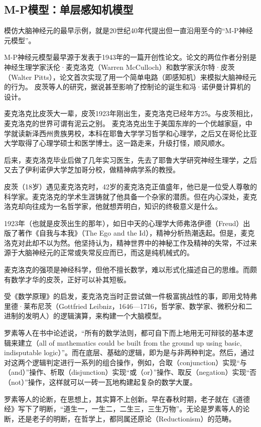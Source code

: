 \subsection{M-P模型：单层感知机模型 }

模仿大脑神经元的最早示例，就是20世纪40年代提出但一直沿用至今的“M-P神经元模型”。

M-P神经元模型最早源于发表于1943年的一篇开创性论文。论文的两位作者分别是神经生理学家沃伦·麦克洛克（Warren McCulloch）和数学家沃尔特·皮茨（Walter Pitts），论文首次实现了用一个简单电路（即感知机）来模拟大脑神经元的行为。
皮茨等人的研究，据说甚至影响了控制论的诞生和冯·诺伊曼计算机的设计。

麦克洛克比皮茨大一辈，皮茨1923年刚出生，麦克洛克已经年方25。与皮茨相比，麦克洛克的世界可谓有泥云之别。
麦克洛克出生于美国东岸的一个优越家庭，中学就读新泽西州贵族男校，本科在耶鲁大学学习哲学和心理学，之后又在哥伦比亚大学取得了心理学硕士和医学博士。这一路走来，升级打怪，顺风顺水。

后来，麦克洛克毕业后做了几年实习医生，先去了耶鲁大学研究神经生理学，之后又去了伊利诺伊大学芝加哥分校，做精神病学系的教授。

皮茨（18岁）遇见麦克洛克时，42岁的麦克洛克正值盛年，他已是一位受人尊敬的科学家。麦克洛克的学术生涯铸就了他具备一个杂家的潜质。但在内心深处，麦克洛克却向往成为一名哲学家，他就想弄明白，知识的终极意义是什么。

1923年（也就是皮茨出生的那年），如日中天的心理学大师弗洛伊德（Freud）出版了著作《自我与本我》（The Ego and the Id），精神分析热潮迭起。但是，麦克洛克对此却不以为然。他坚持认为，精神世界中的神秘工作及精神的失常，不过来源于大脑神经元的正常或失常反应而已，而这是纯机械式的。

麦克洛克的强项是神经科学，但他不擅长数学，难以形式化描述自己的思维。而颇有数学才华的皮茨，正好可以补其短板。

受《数学原理》的启发，麦克洛克当时正尝试做一件极富挑战性的事，即用戈特弗里德·莱布尼茨（Gottfried Leibniz，1646—1716，哲学家、数学家、微积分和二进制的发明人）的逻辑演算，来构建一个大脑模型。

罗素等人在书中论述说，“所有的数学法则，都可自下而上地用无可辩驳的基本逻辑来建立（all of mathematics could be built from the ground up using basic, indisputable logic）”。而在底层、基础的逻辑，即为是与非两种判定。然后，通过对这两个逻辑判定进行一系列的组合操作，例如，合取（conjunction）实现“与（and）”操作、析取（disjunction）实现“或（or）”操作、取反（negation）实现“否（not）”操作，这样就可以一砖一瓦地构建起复杂的数学大厦。

罗素等人的论断，在思想上，其实算不上创新。早在春秋时期，老子就在《道德经》写下了明断，“道生一，一生二，二生三，三生万物”。无论是罗素等人的论断，还是老子的明断，在哲学上，都同属还原论（Reductionism）的范畴。

